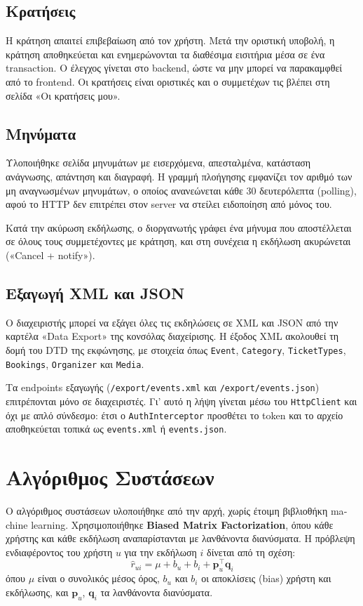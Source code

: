 \documentclass[11pt,a4paper]{article}
\newcommand{\code}[1]{\texttt{#1}}
\begin{document}
\subsection{Κρατήσεις}

Η κράτηση απαιτεί επιβεβαίωση από τον χρήστη. Μετά την οριστική υποβολή, η κράτηση
αποθηκεύεται και ενημερώνονται τα διαθέσιμα εισιτήρια μέσα σε ένα transaction. Ο έλεγχος
γίνεται στο backend, ώστε να μην μπορεί να παρακαμφθεί από το frontend. Οι κρατήσεις
είναι οριστικές και ο συμμετέχων τις βλέπει στη σελίδα «Οι κρατήσεις μου».

\subsection{Μηνύματα}

Υλοποιήθηκε σελίδα μηνυμάτων με εισερχόμενα, απεσταλμένα, κατάσταση ανάγνωσης,
απάντηση και διαγραφή. Η γραμμή πλοήγησης εμφανίζει τον αριθμό των μη αναγνωσμένων
μηνυμάτων, ο οποίος ανανεώνεται κάθε 30 δευτερόλεπτα (polling), αφού το HTTP δεν
επιτρέπει στον server να στείλει ειδοποίηση από μόνος του.

Κατά την ακύρωση εκδήλωσης, ο διοργανωτής γράφει ένα μήνυμα που αποστέλλεται σε όλους
τους συμμετέχοντες με κράτηση, και στη συνέχεια η εκδήλωση ακυρώνεται («Cancel +
notify»).

\subsection{Εξαγωγή XML και JSON}

Ο διαχειριστής μπορεί να εξάγει όλες τις εκδηλώσεις σε XML και JSON από την καρτέλα
«Data Export» της κονσόλας διαχείρισης. Η έξοδος XML ακολουθεί τη δομή του DTD της
εκφώνησης, με στοιχεία όπως \code{Event}, \code{Category}, \code{TicketTypes},
\code{Bookings}, \code{Organizer} και \code{Media}.

Τα endpoints εξαγωγής (\code{/export/events.xml} και \code{/export/events.json})
επιτρέπονται μόνο σε διαχειριστές. Γι' αυτό η λήψη γίνεται μέσω του \code{HttpClient} και όχι με απλό
σύνδεσμο: έτσι ο \code{AuthInterceptor} προσθέτει το token και το αρχείο αποθηκεύεται
τοπικά ως \code{events.xml} ή \code{events.json}.

\section{Αλγόριθμος Συστάσεων}

Ο αλγόριθμος συστάσεων υλοποιήθηκε από την αρχή, χωρίς έτοιμη βιβλιοθήκη
\textenglish{machine learning}. Χρησιμοποιήθηκε \textbf{\textenglish{Biased Matrix Factorization}}, όπου κάθε χρήστης και
κάθε εκδήλωση αναπαρίστανται με λανθάνοντα διανύσματα. Η πρόβλεψη ενδιαφέροντος του
χρήστη $u$ για την εκδήλωση $i$ δίνεται από τη σχέση:
\[
  \hat{r}_{ui} = \mu + b_u + b_i + \mathbf{p}_u^{\top}\mathbf{q}_i
\]
όπου $\mu$ είναι ο συνολικός μέσος όρος, $b_u$ και $b_i$ οι αποκλίσεις (bias) χρήστη και
εκδήλωσης, και $\mathbf{p}_u$, $\mathbf{q}_i$ τα λανθάνοντα διανύσματα.
\end{document}
